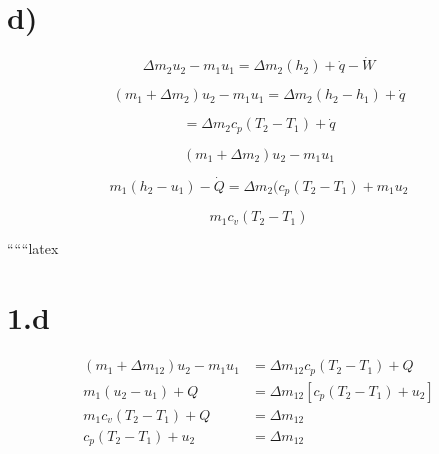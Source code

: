 

\section*{d)}

\[
\Delta m_2 u_2 - m_1 u_1 = \Delta m_2 (h_2) + \dot{q} - \dot{W}
\]

\[
(m_1 + \Delta m_2) u_2 - m_1 u_1 = \Delta m_2 (h_2 - h_1) + \dot{q}
\]

\[
= \Delta m_2 c_p (T_2 - T_1) + \dot{q}
\]

\[
(m_1 + \Delta m_2) u_2 - m_1 u_1
\]

\[
m_1 (h_2 - u_1) - \dot{Q} = \Delta m_2 (c_p (T_2 - T_1) + m_1 u_2
\]

\[
m_1 c_v (T_2 - T_1)
\]

``````latex

\section*{1.d}

\begin{align*}
(m_1 + \Delta m_{12}) u_2 - m_1 u_1 &= \Delta m_{12} c_p (T_2 - T_1) + Q \\
m_1 (u_2 - u_1) + Q &= \Delta m_{12} \left[ c_p (T_2 - T_1) + u_2 \right] \\
m_1 c_v (T_2 - T_1) + Q &= \Delta m_{12} \\
c_p (T_2 - T_1) + u_2 &= \Delta m_{12}
\end{align*}